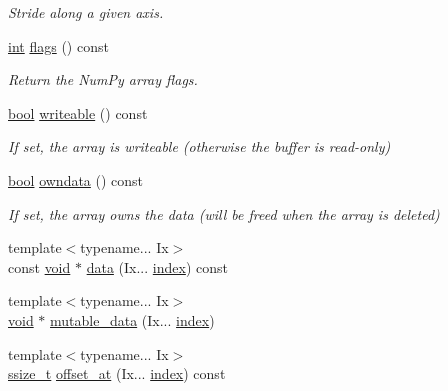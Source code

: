 \begin{DoxyCompactItemize}
\begin{DoxyCompactList}\small\item\em Stride along a given axis. \end{DoxyCompactList}\item 
\mbox{\hyperlink{warnings_8h_a74f207b5aa4ba51c3a2ad59b219a423b}{int}} \mbox{\hyperlink{classarray_a38eb48c793621c12119ab7b64714955b}{flags}} () const
\begin{DoxyCompactList}\small\item\em Return the Num\+Py array flags. \end{DoxyCompactList}\item 
\mbox{\hyperlink{asdl_8h_af6a258d8f3ee5206d682d799316314b1}{bool}} \mbox{\hyperlink{classarray_a9c19f81ca43feebd34b2c9dd5b38f1d9}{writeable}} () const
\begin{DoxyCompactList}\small\item\em If set, the array is writeable (otherwise the buffer is read-\/only) \end{DoxyCompactList}\item 
\mbox{\hyperlink{asdl_8h_af6a258d8f3ee5206d682d799316314b1}{bool}} \mbox{\hyperlink{classarray_aa1ad8575ad6a6b900027c360a44e7ef0}{owndata}} () const
\begin{DoxyCompactList}\small\item\em If set, the array owns the data (will be freed when the array is deleted) \end{DoxyCompactList}\item 
{\footnotesize template$<$typename... Ix$>$ }\\const \mbox{\hyperlink{_s_d_l__opengles2__gl2ext_8h_ae5d8fa23ad07c48bb609509eae494c95}{void}} $\ast$ \mbox{\hyperlink{classarray_a7a8adf48e9a263af91aa975548e0e14d}{data}} (Ix... \mbox{\hyperlink{_s_d_l__opengl__glext_8h_a57f14e05b1900f16a2da82ade47d0c6d}{index}}) const
\item 
{\footnotesize template$<$typename... Ix$>$ }\\\mbox{\hyperlink{_s_d_l__opengles2__gl2ext_8h_ae5d8fa23ad07c48bb609509eae494c95}{void}} $\ast$ \mbox{\hyperlink{classarray_ad06996f0b02fa6dc86e79744cbef5d80}{mutable\+\_\+data}} (Ix... \mbox{\hyperlink{_s_d_l__opengl__glext_8h_a57f14e05b1900f16a2da82ade47d0c6d}{index}})
\item 
{\footnotesize template$<$typename... Ix$>$ }\\\mbox{\hyperlink{detail_2common_8h_ac430d16fc097b3bf0a7469cfd09decda}{ssize\+\_\+t}} \mbox{\hyperlink{classarray_a0063e6a1d118abb371f769377b5fee21}{offset\+\_\+at}} (Ix... \mbox{\hyperlink{_s_d_l__opengl__glext_8h_a57f14e05b1900f16a2da82ade47d0c6d}{index}}) const

\end{DoxyCompactItemize}
